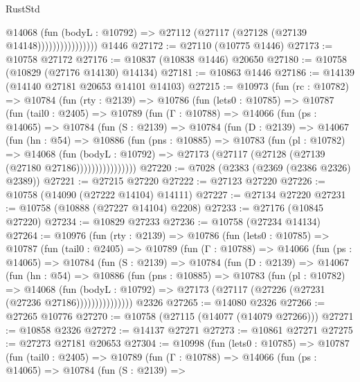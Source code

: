 \begin{lexlean}{RustStd}
\begin{coremodule}
                          @14068
                            (fun (bodyL : @10792) =>
                            @27112 (@27117 (@27128 (@27139 @14148))))))))))))))))
    @1446
@27172 := @27110 (@10775 @1446)
@27173 := @10758 @27172
@27176 := @10837 (@10838 @1446) @20650
@27180 := @10758 (@10829 (@27176 @14130) @14134)
@27181 := @10863 @1446
@27186 := @14139 (@14140 @27181 @20653 @14101 @14103)
@27215 := @10973
    (fun (rc : @10782) =>
    @10784
      (fun (rty : @2139) =>
      @10786
        (fun (lets0 : @10785) =>
        @10787
          (fun (tail0 : @2405) =>
          @10789
            (fun (Γ : @10788) =>
            @14066
              (fun (ps : @14065) =>
              @10784
                (fun (S : @2139) =>
                @10784
                  (fun (D : @2139) =>
                  @14067
                    (fun (hn : @54) =>
                    @10886
                      (fun (pns : @10885) =>
                      @10783
                        (fun (pl : @10782) =>
                        @14068
                          (fun (bodyL : @10792) =>
                          @27173 (@27117 (@27128 (@27139 (@27180 @27186))))))))))))))))
@27220 := @7028 (@2383 (@2369 (@2386 @2326) @2389))
@27221 := @27215 @27220
@27222 := @27123 @27220
@27226 := @10758 (@14090 (@27222 @14104) @14111)
@27227 := @27134 @27220
@27231 := @10758 (@10888 (@27227 @14104) @2208)
@27233 := @27176 (@10845 @27220)
@27234 := @10829 @27233
@27236 := @10758 (@27234 @14134)
@27264 := @10976
    (fun (rty : @2139) =>
    @10786
      (fun (lets0 : @10785) =>
      @10787
        (fun (tail0 : @2405) =>
        @10789
          (fun (Γ : @10788) =>
          @14066
            (fun (ps : @14065) =>
            @10784
              (fun (S : @2139) =>
              @10784
                (fun (D : @2139) =>
                @14067
                  (fun (hn : @54) =>
                  @10886
                    (fun (pns : @10885) =>
                    @10783
                      (fun (pl : @10782) =>
                      @14068
                        (fun (bodyL : @10792) =>
                        @27173 (@27117 (@27226 (@27231 (@27236 @27186)))))))))))))))
    @2326
@27265 := @14080 @2326
@27266 := @27265 @10776
@27270 := @10758 (@27115 (@14077 (@14079 @27266)))
@27271 := @10858 @2326
@27272 := @14137 @27271
@27273 := @10861 @27271
@27275 := @27273 @27181 @20653
@27304 := @10998
    (fun (lets0 : @10785) =>
    @10787
      (fun (tail0 : @2405) =>
      @10789
        (fun (Γ : @10788) =>
        @14066
          (fun (ps : @14065) =>
          @10784
            (fun (S : @2139) =>

\end{coremodule}
\end{lexlean}
